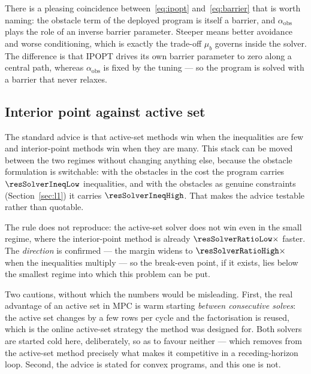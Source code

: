 \documentclass[11pt,a4paper]{article}
\newcommand{\aobs}{\alpha_{\mathrm{obs}}}
\begin{document}
There is a pleasing coincidence between~\eqref{eq:ipopt} and~\eqref{eq:barrier} that is worth naming: the
obstacle term of the deployed program is itself a barrier, and $\aobs$ plays the role of an inverse barrier
parameter. Steeper means better avoidance and worse conditioning, which is exactly the trade-off $\mu_b$
governs inside the solver. The difference is that IPOPT drives its own barrier parameter to zero along a
central path, whereas $\aobs$ is fixed by the tuning --- so the program is solved with a barrier that never
relaxes.

\subsection{Interior point against active set}
\label{sec:solvercmp}

The standard advice is that active-set methods win when the inequalities are few and interior-point methods
win when they are many. This stack can be moved between the two regimes without changing anything else,
because the obstacle formulation is switchable: with the obstacles in the cost the program carries
$\resSolverIneqLow$ inequalities, and with the obstacles as genuine constraints (Section~\ref{sec:l1}) it
carries $\resSolverIneqHigh$. That makes the advice testable rather than quotable.

\begin{table}[htbp]
  \centering
  \small
  \caption{The same instance solved by a primal--dual interior-point method and by an SQP with an active-set QP solver, in both obstacle regimes. Both are started cold. Bold: the faster of the two.}
  \label{res:tab:solvercmp}
\end{table}

The rule does not reproduce: the active-set solver does not win even in the small regime, where the
interior-point method is already $\resSolverRatioLow\times$ faster. The \emph{direction} is confirmed --- the
margin widens to $\resSolverRatioHigh\times$ when the inequalities multiply --- so the break-even point, if
it exists, lies below the smallest regime into which this problem can be put.

Two cautions, without which the numbers would be misleading. First, the real advantage of an active set in
MPC is warm starting \emph{between consecutive solves}: the active set changes by a few rows per cycle and
the factorisation is reused, which is the online active-set strategy the method was designed for. Both
solvers are started cold here, deliberately, so as to favour neither --- which removes from the active-set
method precisely what makes it competitive in a receding-horizon loop. Second, the advice is stated for
convex programs, and this one is not.
\end{document}
